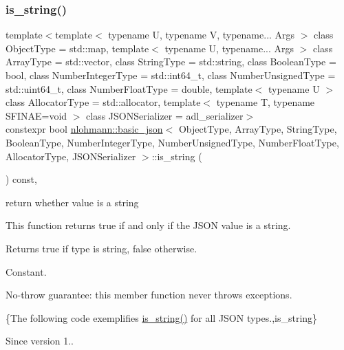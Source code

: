 \subsubsection{\texorpdfstring{is\+\_\+string()}{is\_string()}}
{\footnotesize\ttfamily template$<$template$<$ typename U, typename V, typename... Args $>$ class Object\+Type = std\+::map, template$<$ typename U, typename... Args $>$ class Array\+Type = std\+::vector, class String\+Type  = std\+::string, class Boolean\+Type  = bool, class Number\+Integer\+Type  = std\+::int64\+\_\+t, class Number\+Unsigned\+Type  = std\+::uint64\+\_\+t, class Number\+Float\+Type  = double, template$<$ typename U $>$ class Allocator\+Type = std\+::allocator, template$<$ typename T, typename S\+F\+I\+N\+A\+E=void $>$ class J\+S\+O\+N\+Serializer = adl\+\_\+serializer$>$ \\
constexpr bool \mbox{\hyperlink{classnlohmann_1_1basic__json}{nlohmann\+::basic\+\_\+json}}$<$ Object\+Type, Array\+Type, String\+Type, Boolean\+Type, Number\+Integer\+Type, Number\+Unsigned\+Type, Number\+Float\+Type, Allocator\+Type, J\+S\+O\+N\+Serializer $>$\+::is\+\_\+string (\begin{DoxyParamCaption}{ }\end{DoxyParamCaption}) const\hspace{0.3cm}{\ttfamily [inline]}, {\ttfamily [noexcept]}}



return whether value is a string 

This function returns true if and only if the J\+S\+ON value is a string.

\begin{DoxyReturn}{Returns}
{\ttfamily true} if type is string, {\ttfamily false} otherwise.
\end{DoxyReturn}
Constant.

No-\/throw guarantee\+: this member function never throws exceptions.

\{The following code exemplifies {\ttfamily \mbox{\hyperlink{classnlohmann_1_1basic__json_a69b596a4a6683b362095c9a139637396}{is\+\_\+string()}}} for all J\+S\+ON types.,is\+\_\+string\}

\begin{DoxySince}{Since}
version 1.. 
\end{DoxySince}
\mbox{\label{classnlohmann_1_1basic__json_a9f68a0af820c3ced7f9d17851ce4c22d}} 
